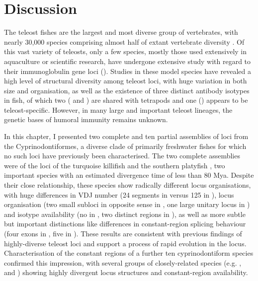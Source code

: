 \newpage

\section{Discussion}

The teleost fishes are the largest and most diverse group of vertebrates, with nearly 30,000 species comprising almost half of extant vertebrate diversity \parencite{ravi2018divergent}. Of this vast variety of teleosts, only a few species, mostly those used extensively in aquaculture or scientific research, have undergone extensive study with regard to their immunoglobulin gene loci (). Studies in these model species have revealed a high level of structural diversity among teleost \igh{} loci, with huge variation in both size and organisation, as well as the existence of three distinct antibody isotypes in fish, of which two ( and ) are shared with tetrapods and one () appears to be teleost-specific. However, in many large and important teleost lineages, the genetic bases of humoral immunity remains unknown.

In this chapter, I presented two complete and ten partial assemblies of \igh{} loci from the Cyprinodontiformes, a diverse clade of primarily freshwater fishes for which no such loci have previously been characterised. The two complete assemblies were of the \igh{} loci of the turquoise killifish \nfu and the southern platyfish \xma, two important species with an estimated divergence time of less than 80 Mya. Despite their close relationship, these species show radically different locus organisations, with huge differences in VDJ number (24 \vh segments in \Nfu versus 125 in \Xma), locus organisation (two small subloci in opposite sense in \Nfu, one large unitary locus in \Xma) and isotype availability (no  in \Nfu, two distinct  regions in \Xma), as well as more subtle but important distinctions like differences in constant-region splicing behaviour (four exons in \Nfu {}, five in \Xma). These results are consistent with previous findings of highly-diverse teleost loci and support a process of rapid evolution in the \igh{} locus. Characterisation of the constant regions of a further ten cyprinodontiform species confirmed this impression, with several groups of closely-related species (e.g. \nfu,  and ) showing highly divergent locus structures and constant-region availability.

